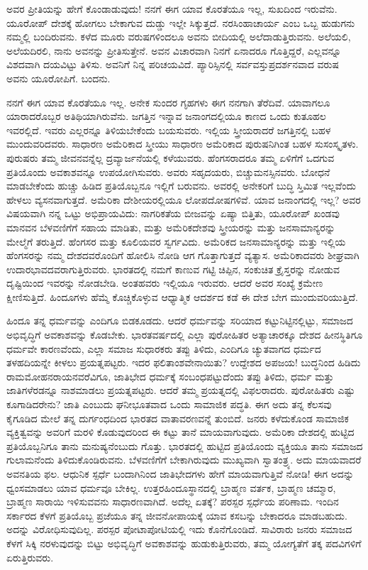 ಅವರ ಪ್ರೀತಿಯನ್ನು ಹೇಗೆ ಕೊಂಡಾಡುವುದು! ನನಗೆ ಈಗ ಯಾವ ಕೊರತೆಯೂ ಇಲ್ಲ, ಸುಖದಿಂದ ಇರುವೆನು. ಯೂರೋಪ್ ದೇಶಕ್ಕೆ ಹೋಗಲು ಬೇಕಾಗುವ ದುಡ್ಡು ಇಲ್ಲೇ ಸಿಕ್ಕುತ್ತದೆ. ನರಸಿಂಹಾಚಾರ್ಯ ಎಂಬ ಒಬ್ಬ ಹುಡುಗನು ನಮ್ಮಲ್ಲಿ ಬಂದಿರುವನು. ಕಳೆದ ಮೂರು ವರುಷಗಳಿಂದಲೂ ಅವನು ಬೀದಿಯಲ್ಲಿ ಅಲೆದಾಡುತ್ತಿರುವನು. ಅಲೆಯಲಿ, ಅಲೆಯದಿರಲಿ, ನಾನು ಅವನನ್ನು ಪ್ರೀತಿಸುತ್ತೇನೆ. ಅವನ ವಿಚಾರವಾಗಿ ನಿನಗೆ ಏನಾದರೂ ಗೊತ್ತಿದ್ದರೆ, ಎಲ್ಲವನ್ನೂ ವಿಶದವಾಗಿ ದಯವಿಟ್ಟು ತಿಳಿಸು. ಅವನಿಗೆ ನಿನ್ನ ಪರಿಚಯವಿದೆ. ಪ್ಯಾರಿಸ್ಸಿನಲ್ಲಿ ಸರ್ವವಸ್ತುಪ್ರದರ್ಶನವಾದ ವರುಷ ಅವನು ಯೂರೋಪಿಗೆ. ಬಂದನು.

ನನಗೆ ಈಗ ಯಾವ ಕೊರತೆಯೂ ಇಲ್ಲ. ಅನೇಕ ಸುಂದರ ಗೃಹಗಳು ಈಗ ನನಗಾಗಿ ತೆರೆದಿವೆ. ಯಾವಾಗಲೂ ಯಾರಾದರೊಬ್ಬರ ಅತಿಥಿಯಾಗಿರುವೆನು. ಜಗತ್ತಿನ ಇನ್ನಾವ ಜನಾಂಗದಲ್ಲಿಯೂ ಕಾಣದ ಒಂದು ಕುತೂಹಲ ಇವರಲ್ಲಿದೆ. ಇವರು ಎಲ್ಲರನ್ನೂ ತಿಳಿಯಬೇಕೆಂದು ಬಯಸುವರು. ಇಲ್ಲಿಯ ಸ್ತ್ರೀಯರಾದರೆ ಜಗತ್ತಿನಲ್ಲಿ ಬಹಳ ಮುಂದುವರಿದವರು. ಸಾಧಾರಣ ಅಮೆರಿಕಾದ ಸ್ತ್ರೀಯು ಸಾಧಾರಣ ಅಮೆರಿಕಾದ ಪುರುಷನಿಗಿಂತ ಬಹಳ ಸುಸಂಸ್ಕೃತಳು. ಪುರುಷರು ತಮ್ಮ ಜೀವನವನ್ನೆಲ್ಲ ದ್ರವ್ಯಾರ್ಜನೆಯಲ್ಲಿ ಕಳೆಯುವರು. ಹೆಂಗಸರಾದರೂ ತಮ್ಮ ಏಳಿಗೆಗೆ ಒದಗುವ ಪ್ರತಿಯೊಂದು ಅವಕಾಶವನ್ನೂ ಉಪಯೋಗಿಸುವರು. ಅವರು ಸಹೃದಯರು, ಬಿಚ್ಚುಮನಸ್ಸಿನವರು. ಬೋಧನೆ ಮಾಡಬೇಕೆಂದು ಹುಚ್ಚು ಹಿಡಿದ ಪ್ರತಿಯೊಬ್ಬನೂ ಇಲ್ಲಿಗೆ ಬರುವನು. ಅವರಲ್ಲಿ ಅನೇಕರಿಗೆ ಬುದ್ಧಿ ಸ್ತಿಮಿತ ಇಲ್ಲವೆಂದು ಹೇಳಲು ವ್ಯಸನವಾಗುತ್ತದೆ. ಅಮೆರಿಕಾ ದೇಶೀಯರಲ್ಲಿಯೂ ಲೋಪದೋಷಗಳಿವೆ. ಯಾವ ಜನಾಂಗದಲ್ಲಿ ಇಲ್ಲ? ಅವರ ವಿಷಯವಾಗಿ ನನ್ನ ಒಟ್ಟು ಅಭಿಪ್ರಾಯವಿದು: ನಾಗರಿಕತೆಯ ಬೀಜವನ್ನು ಏಷ್ಯಾ ಬಿತ್ತಿತು, ಯೂರೋಪ್ ಖಂಡವು ಮಾನವನ ಬೆಳವಣಿಗೆಗೆ ಸಹಾಯ ಮಾಡಿತು, ಮತ್ತು ಅಮೆರಿಕದೇಶವು ಸ್ತ್ರೀಯರನ್ನು ಮತ್ತು ಜನಸಾಮಾನ್ಯರನ್ನು ಮೇಲ್ಮೆಗೆ ತರುತ್ತಿದೆ. ಹೆಂಗಸರ ಮತ್ತು ಕೂಲಿಯವರ ಸ್ವರ್ಗವಿದು. ಅಮೆರಿಕದ ಜನಸಾಮಾನ್ಯರನ್ನು ಮತ್ತು ಇಲ್ಲಿಯ ಹೆಂಗಸರನ್ನು ನಮ್ಮ ದೇಶದವರೊಂದಿಗೆ ಹೋಲಿಸಿ ನೋಡಿ ಆಗ ಗೊತ್ತಾಗುತ್ತದೆ ವ್ಯತ್ಯಾಸ. ಅಮೆರಿಕಾದವರು ಶೀಘ್ರವಾಗಿ ಉದಾರಭಾವದವರಾಗುತ್ತಿರುವರು. ಭಾರತದಲ್ಲಿ ನಮಗೆ ಕಾಣುವ ಗಟ್ಟಿ ಚಿಪ್ಪಿನ, ಸಂಕುಚಿತ ಕ್ರೈಸ್ತರನ್ನು ನೋಡುವ ದೃಷ್ಟಿಯಿಂದ ಇವರನ್ನು ನೋಡಬೇಡಿ. ಅಂತಹವರು ಇಲ್ಲಿಯೂ ಇರುವರು. ಆದರೆ ಅವರ ಸಂಖ್ಯೆ ಕ್ರಮೇಣ ಕ್ಷೀಣಿಸುತ್ತಿದೆ. ಹಿಂದೂಗಳು ಹೆಮ್ಮೆ ಕೊಚ್ಚಿಕೊಳ್ಳುವ ಆಧ್ಯಾತ್ಮಿಕ ಆದರ್ಶದ ಕಡೆ ಈ ದೇಶ ಬೇಗ ಮುಂದುವರಿಯುತ್ತಿದೆ.

ಹಿಂದೂ ತನ್ನ ಧರ್ಮವನ್ನು ಎಂದಿಗೂ ಬಿಡಕೂಡದು. ಆದರೆ ಧರ್ಮವನ್ನು ಸರಿಯಾದ ಕಟ್ಟುನಿಟ್ಟಿನಲ್ಲಿಟ್ಟು, ಸಮಾಜದ ಅಭಿವೃದ್ಧಿಗೆ ಅವಕಾಶವನ್ನು ಕೊಡಬೇಕು. ಭಾರತವರ್ಷದಲ್ಲಿ ಎಲ್ಲಾ ಪುರೋಹಿತರ ಅತ್ಯಾಚಾರಕ್ಕೂ ದೇಶದ ಹೀನಸ್ಥಿತಿಗೂ ಧರ್ಮವೇ ಕಾರಣವೆಂದು, ಎಲ್ಲಾ ಸಮಾಜ ಸುಧಾರಕರು ತಪ್ಪು ತಿಳಿದು, ಎಂದಿಗೂ ಚ್ಯುತವಾಗದ ಧರ್ಮದ ತಳಹದಿಯನ್ನೇ ಕೀಳಲು ಪ್ರಯತ್ನಪಟ್ಟರು. ಇದರ ಫಲಿತಾಂಶವೇನಾಯಿತು? ಉದ್ದೇಶದ ಅಪಜಯ! ಬುದ್ಧನಿಂದ ಹಿಡಿದು ರಾಮಮೋಹನರಾಯನವರೆವಿಗೂ, ಜಾತಿಭೇದ ಧರ್ಮಕ್ಕೆ ಸಂಬಂಧಪಟ್ಟುದೆಂದು ತಪ್ಪು ತಿಳಿದು, ಧರ್ಮ ಮತ್ತು ಜಾತಿಗಳೆರಡನ್ನೂ ನಾಶಮಾಡಲು ಪ್ರಯತ್ನಪಟ್ಟರು. ಆದರೆ ತಮ್ಮ ಪ್ರಯತ್ನದಲ್ಲಿ ವಿಫಲರಾದರು. ಪುರೋಹಿತರು ಎಷ್ಟು ಕೂಗಾಡಿದರೇನು? ಜಾತಿ ಎಂಬುದು ಘನೀಭೂತವಾದ ಒಂದು ಸಾಮಾಜಿಕ ಪದ್ಧತಿ. ಈಗ ಅದು ತನ್ನ ಕೆಲಸವು ಕೈಗೂಡಿದ ಮೇಲೆ ತನ್ನ ದುರ್ಗಂಧದಿಂದ ಭಾರತದ ವಾತಾವರಣವನ್ನೆ ತುಂಬಿದೆ. ಜನರು ಕಳೆದುಕೊಂಡ ಸಾಮಾಜಿಕ ವ್ಯಕ್ತಿತ್ವವನ್ನು ಅವರಿಗೆ ಮರಳಿ ಕೊಡುವುದರಿಂದ ಈ ಕಟ್ಟು ತಾನೆ ಮಾಯವಾಗುವುದು. ಅಮೆರಿಕಾ ದೇಶದಲ್ಲಿ ಹುಟ್ಟಿದ ಪ್ರತಿಯೊಬ್ಬನಿಗೂ ತಾನು ಮನುಷ್ಯನೆಂಬುದು ಗೊತ್ತು. ಭಾರತದಲ್ಲಿ ಹುಟ್ಟಿದ ಪ್ರತಿಯೊಂದು ವ್ಯಕ್ತಿಯೂ ತಾನು ಸಮಾಜದ ಗುಲಾಮನೆಂದು ತಿಳಿದುಕೊಂಡಿರುವನು. ಬೆಳವಣಿಗೆಗೆ ಬೇಕಾಗಿರುವುದು ಮುಖ್ಯವಾಗಿ ಸ್ವಾತಂತ್ರ್ಯ. ಅದು ಮಾಯವಾದರೆ ಅವನತಿಯ ಫಲ. ಆಧುನಿಕ ಸ್ಪರ್ಧೆ ಬಂದಾಗಿನಿಂದ ಜಾತಿಭೇದಗಳು ಹೇಗೆ ಮಾಯವಾಗುತ್ತಿವೆ ನೋಡಿ! ಈಗ ಅದನ್ನು ಧ್ವಂಸಮಾಡಲು ಯಾವ ಧರ್ಮವೂ ಬೇಕಿಲ್ಲ. ಉತ್ತರಹಿಂದೂಸ್ಥಾನದಲ್ಲಿ ಬ್ರಾಹ್ಮಣ ವರ್ತಕ, ಬ್ರಾಹ್ಮಣ ಚಮ್ಮಾರ, ಬ್ರಾಹ್ಮಣ ಸಾರಾಯಿ ಇಳಿಸುವವನು ಸಾಧಾರಣವಾಗಿದೆ. ಅದೆಲ್ಲ ಏತಕ್ಕೆ? ಪರಸ್ಪರ ಸ್ಪರ್ಧೆಯ ಪರಿಣಾಮ. ಇಂದಿನ ಸರ್ಕಾರದ ಕೆಳಗೆ ಪ್ರತಿಯೊಬ್ಬ ಪ್ರಜೆಯೂ ತನ್ನ ಜೀವನೋಪಾಯಕ್ಕೆ ಯಾವ ಕಸಬನ್ನು ಬೇಕಾದರೂ ಮಾಡಬಹುದು. ಅದನ್ನು ವಿರೋಧಿಸುವುದಿಲ್ಲ. ಪರಸ್ಪರ ಪೋಟಾಪೋಟಿಯಲ್ಲಿ ಇದು ಕೊನೆಗೊಂಡಿದೆ. ಸಾವಿರಾರು ಜನರು ಸಮಾಜದ ಕೆಳಗೆ ಸಿಕ್ಕಿ ನರಳುವುದನ್ನು ಬಿಟ್ಟು ಅಭಿವೃದ್ಧಿಗೆ ಅವಕಾಶವನ್ನು ಹುಡುಕುತ್ತಿರುವರು, ತಮ್ಮ ಯೋಗ್ಯತೆಗೆ ತಕ್ಕ ಪದವಿಗಳಿಗೆ ಏರುತ್ತಿರುವರು.

